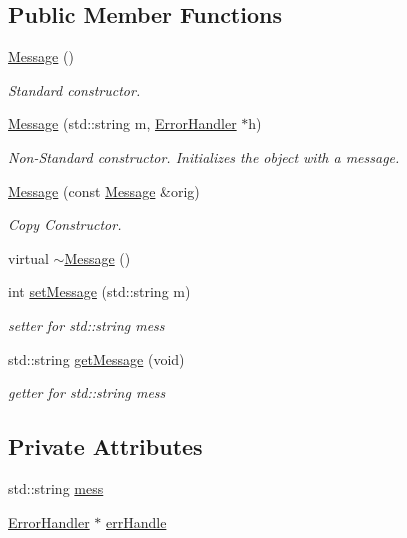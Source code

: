 \subsection*{Public Member Functions}
\begin{DoxyCompactItemize}
\item 
\mbox{\hyperlink{classMessage_a4fc4f717b634e66070366cb7722d7761}{Message}} ()
\begin{DoxyCompactList}\small\item\em Standard constructor. \end{DoxyCompactList}\item 
\mbox{\hyperlink{classMessage_a77d26df352bf5aaaba85ccf940238257}{Message}} (std\+::string m, \mbox{\hyperlink{classErrorHandler}{Error\+Handler}} $\ast$h)
\begin{DoxyCompactList}\small\item\em Non-\/\+Standard constructor. Initializes the object with a message. \end{DoxyCompactList}\item 
\mbox{\hyperlink{classMessage_afc0cbea76e5ed74d86af6b6646fd8642}{Message}} (const \mbox{\hyperlink{classMessage}{Message}} \&orig)
\begin{DoxyCompactList}\small\item\em Copy Constructor. \end{DoxyCompactList}\item 
virtual \mbox{\hyperlink{classMessage_a3f7275462831f787a861271687bcad67}{$\sim$\+Message}} ()
\item 
int \mbox{\hyperlink{classMessage_aa1e4c60f94308a9367ad3106c34b28f3}{set\+Message}} (std\+::string m)
\begin{DoxyCompactList}\small\item\em setter for std\+::string mess \end{DoxyCompactList}\item 
std\+::string \mbox{\hyperlink{classMessage_a8d2e67a8732ecaeca309df6ac5dda156}{get\+Message}} (void)
\begin{DoxyCompactList}\small\item\em getter for std\+::string mess \end{DoxyCompactList}\end{DoxyCompactItemize}
\subsection*{Private Attributes}
\begin{DoxyCompactItemize}
\item 
std\+::string \mbox{\hyperlink{classMessage_a71af4fd1655feab5f4986782f9c1bc92}{mess}}
\item 
\mbox{\hyperlink{classErrorHandler}{Error\+Handler}} $\ast$ \mbox{\hyperlink{classMessage_a1052f94ece434575f0f783bc8ed3269e}{err\+Handle}}
\end{DoxyCompactItemize}


